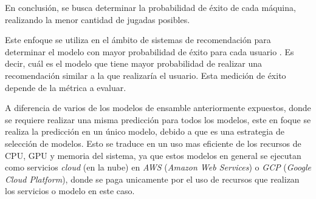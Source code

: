 \documentclass[11pt,a4paper,twoside]{thesis}
\begin{document}
En conclusión, se busca determinar la probabilidad de éxito de cada máquina,
realizando la menor cantidad de jugadas posibles.

Este enfoque se utiliza en el ámbito de sistemas de recomendación para
determinar el modelo con mayor probabilidad de éxito para cada usuario
\cite{broden2018ensemble, canamares2019multi, chakrabarti2008mortal,
	thompson-sampling-intuition, thompson-sampling-code, build-mab, solve-mab}. Es
decir, cuál es el modelo que tiene mayor probabilidad de realizar una
recomendación similar a la que realizaría el usuario. Esta medición de éxito
depende de la métrica a evaluar.

A diferencia de varios de los modelos de ensamble anteriormente expuestos,
donde se requiere realizar una misma predicción para todos los modelos, este en
foque se realiza la predicción en un único modelo, debido a que es una
estrategia de selección de modelos. Esto se traduce en un uso mas eficiente de
los recursos de CPU, GPU y memoria del sistema, ya que estos modelos en general
se ejecutan como servicios \textit{cloud} (en la nube) en \textit{AWS}
(\textit{Amazon Web Services}) o \textit{GCP} (\textit{Google Cloud Platform}),
donde se paga unicamente por el uso de recursos que realizan los servicios o
modelo en este caso.



\renewcommand{\bibname}{Referencias}
\end{document}
